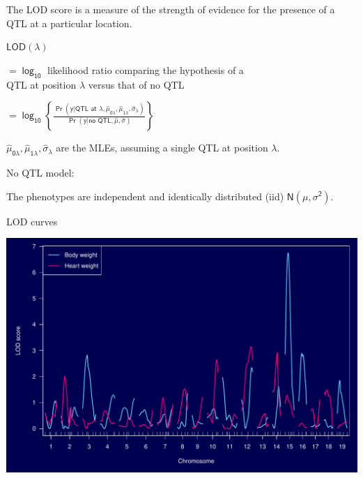 \documentclass[12pt]{article}
\newcommand{\headsize}{\fontsize{35}{35} \selectfont}
\newcommand{\smallersize}{\fontsize{20}{25} \selectfont}
\newcommand{\lod}{\text{LOD}}
\begin{document}
\hfill
\begin{minipage}{10in}
\color{mywhite} \smallersize
 The LOD score is a measure of the {\color{mypink} strength of
evidence} for the presence of a QTL at a particular
location.
\vspace{15mm}

 $\mathsf{\lod(\lambda)}$
\begin{minipage}[t]{8.5in}
$\mathsf{= \log_{10}}$ likelihood ratio comparing the hypothesis of a \\
\hspace*{8mm} QTL at position $\mathsf{\lambda}$ versus that of no QTL
\vspace{5mm}

\headsize
$\mathsf{= \log_{10} \left\{ \frac{\Pr(y | \text{QTL at $\lambda$}, \hat{\mu}_{0\lambda},
\hat{\mu}_{1\lambda}, \hat{\sigma}_\lambda)}{\Pr(y | \text{no QTL}, \hat{\mu},
\hat{\sigma})} \right\}}$
\end{minipage}
\vspace{15mm}

 $\mathsf{\hat{\mu}_{0\lambda}, \hat{\mu}_{1\lambda}, \hat{\sigma}_\lambda}$ are the MLEs,
assuming a single QTL at position $\mathsf{\lambda}$.
\vspace{15mm}

 No QTL model:
\begin{minipage}[t]{7.5in}
The phenotypes are independent and identically
distributed (iid) $\mathsf{N(\mu, \sigma^2)}$.
\end{minipage}
\end{minipage}







\newpage

\headsize \color{myyellow}
\hfill \begin{minipage}{5.75in}
\centering
LOD curves
\end{minipage}

\vfill

\centerline{\includegraphics{FigsA/alod.pdf}}
\end{document}
